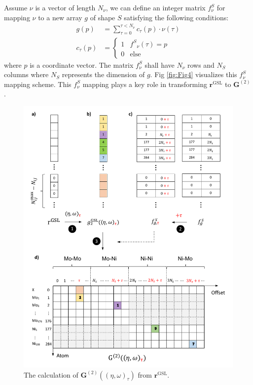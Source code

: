\documentclass[preprint]{revtex4-2}
\begin{document}
Assume $\nu$ is a vector of length $N_{\nu}$, we can define an integer matrix 
$f^{S}_{\nu}$ for mapping $\nu$ to a new array $g$ of shape $S$ satisfying the 
following conditions:
\begin{align}
\label{eq:scatter_nd}
g(p) & = \sum_{\tau=0}^{\tau < N_{\nu}}{c_\tau(p) \cdot \nu(\tau)} \\
c_{\tau}(p) & = \begin{cases}
    1 & {f^S}_{\nu}(\tau) = p \\
    0 & \mathrm{else}
\end{cases}
\end{align}
where $p$ is a coordinate vector. The matrix $f^{S}_{\nu}$ shall have $N_{\nu}$ 
rows and $N_S$ columns where $N_S$ represents the dimension of $g$. 
Fig \ref{fig:Fig4} visualizes this $f^S_{\nu}$ mapping scheme. This $f^S_{\nu}$
mapping plays a key role in transforming $\mathbf{r}^{\mathrm{GSL}}$ to 
$\mathbf{G}^{(2)}$.

% 
%
\begin{figure}[h!]
\centering
\includegraphics[scale=0.95]{figures/Fig5.pdf}
\caption{\label{fig:Fig5} The calculation of 
$\mathbf{G}^{(2)}((\eta, \omega)_{\tau})$ from $\mathbf{r}^{\mathrm{GSL}}$. 
}
\end{figure}
\end{document}
